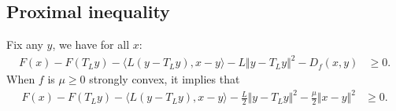 \documentclass[12pt]{article}
\begin{document}
    \subsection{Proximal inequality}
    \begin{theorem}\label{thm:prox-grad-ineq}
        Fix any $y$, we have for all $x$: 
        \begin{align*}
            F(x) - F(T_Ly) - \langle L(y - T_Ly), x - y\rangle
            - L\Vert y - T_L y\Vert^2
            - D_f(x, y)
            &\ge  
            0. 
        \end{align*}
        When $f$ is $\mu \ge 0$ strongly convex, it implies that 
        \begin{align*}
            F(x) - F(T_Ly) - \langle L(y - T_Ly), x - y\rangle
            - \frac{L}{2}\Vert y - T_L y\Vert^2
            - \frac{\mu}{2}\Vert x - y\Vert^2
            &\ge  
            0.
        \end{align*}
    \end{theorem}
\end{document}
